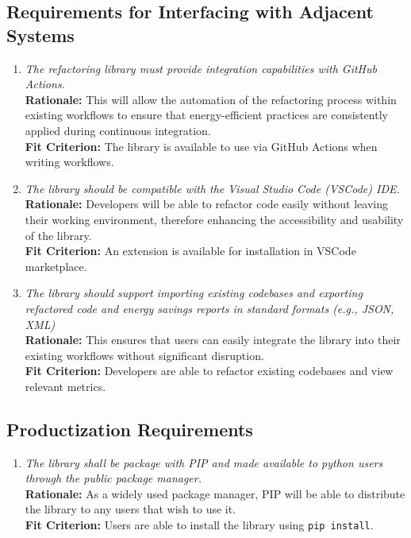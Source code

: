\documentclass[12pt]{article}
\begin{document}
\subsection{Requirements for Interfacing with Adjacent Systems}
\begin{enumerate}[label=OER-IAS \arabic*., wide=0pt, leftmargin=*]
	\item \emph{The refactoring library must provide integration capabilities with GitHub Actions.}\\[2mm]
    {\bf Rationale:} This will allow the automation of the refactoring process within existing workflows to ensure that energy-efficient practices are consistently applied during continuous integration.\\
    {\bf Fit Criterion:} The library is available to use via GitHub Actions when writing workflows.
  \item \emph{The library should be compatible with the Visual Studio Code (VSCode) IDE.}\\[2mm]
    {\bf Rationale:} Developers will be able to refactor code easily without leaving their working environment, therefore enhancing the accessibility and usability of the library.\\
    {\bf Fit Criterion:} An extension is available for installation in VSCode marketplace.
  \item \emph{The library should support importing existing codebases and exporting refactored code and energy savings reports in standard formats (e.g., JSON, XML)}\\[2mm]
    {\bf Rationale:} This ensures that users can easily integrate the library into their existing workflows without significant disruption.\\
    {\bf Fit Criterion:} Developers are able to refactor existing codebases and view relevant metrics.
\end{enumerate}

\subsection{Productization Requirements}
\begin{enumerate}[label=OER-PR \arabic*., wide=0pt, leftmargin=*]
	\item \emph{The library shall be package with PIP and made available to python users through the public package manager.}\\[2mm]
    {\bf Rationale:} As a widely used package manager, PIP will be able to distribute the library to any users that wish to use it.\\
    {\bf Fit Criterion:} Users are able to install the library using \texttt{pip install}. 
\end{enumerate}
\end{document}
